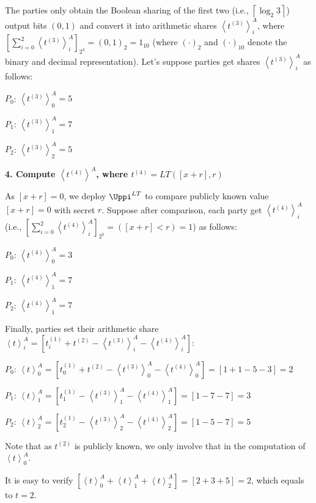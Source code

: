 The parties only obtain the Boolean sharing of the first two (i.e., $\left\lceil \log_2 3\right\rceil $) output bits $\left(0,1\right) $ and convert it into arithmetic shares $\left\langle t^{\left(3\right) }\right\rangle^A_i$, where $\left[\sum_{i=0}^{2} \left\langle t^{\left(3\right) }\right\rangle^A_i\right] _{2^3}=\left(0,1\right)_2=1_{10} $ (where $\left(\cdot\right)_2 $ and $\left(\cdot\right)_{10} $ denote the binary and decimal representation).
Let's suppose parties get shares $\left\langle t^{\left(3\right) }\right\rangle^A_i$ as follows:

$P_0$: $\left\langle t^{\left(3\right) }\right\rangle^A_0=5$

$P_1$: $\left\langle t^{\left(3\right) }\right\rangle^A_1=7$

$P_2$: $\left\langle t^{\left(3\right) }\right\rangle^A_2=5$

\textbf{4. Compute $\left\langle t^{\left(4\right) }\right\rangle^A $, where $t^{\left(4\right) }=LT\left(\left[x+r  \right] ,  r  \right) $}

As $\left[x+r  \right] =0$, we deploy $\Uppi^{LT}$ to compare publicly known value $\left[x+r  \right] =0$ with secret $r$.
Suppose after comparison, each party get $\left\langle t^{\left(4\right) }\right\rangle^A_i $ (i.e., $\left[\sum_{i=0}^{2}  \left\langle t^{\left(4\right) }\right\rangle^A_i\right] _{2^{3}} =\left(\left[x+r  \right]<r\right) =1$) as follows:

$P_0$: $\left\langle t^{\left(4\right) }\right\rangle^A_0 =3$

$P_1$: $\left\langle t^{\left(4\right) }\right\rangle^A_1= 7$

$P_2$: $\left\langle t^{\left(4\right) }\right\rangle^A_1= 7$

Finally, parties set their arithmetic share $\left\langle t\right\rangle^A_i =\left[t^{(1)}_i+t^{\left(2\right) }-\left\langle t^{(3)}\right\rangle^A_i-\left\langle t^{(4)}\right\rangle^A_i \right] $:

$P_0$: $\left\langle t\right\rangle^A_0= \left[t^{(1)}_0+t^{\left(2\right) }-\left\langle t^{(3)}\right\rangle^A_0-\left\langle t^{(4)}\right\rangle^A_0\right] =\left[1+1-5-3\right] =2$

$P_1$: $\left\langle t\right\rangle^A_1= \left[t^{(1)}_1-\left\langle t^{(3)}\right\rangle^A_1-\left\langle t^{(4)}\right\rangle^A_1\right] =\left[1-7-7\right] =3$

$P_2$: $\left\langle t\right\rangle^A_2= \left[t^{(1)}_2-\left\langle t^{(3)}\right\rangle^A_2-\left\langle t^{(4)}\right\rangle^A_2\right]   =\left[1-5-7\right]=5 $

Note that as $t^{\left(2\right) }$ is publicly known, we only involve that in the computation of $\left\langle t\right\rangle^A_0$.

It is easy to verify $\left[\left\langle t\right\rangle^A_0+\left\langle t\right\rangle^A_1+\left\langle t\right\rangle^A_2\right]=\left[2+3+5\right] =2 $, which equals to $t=2$.
